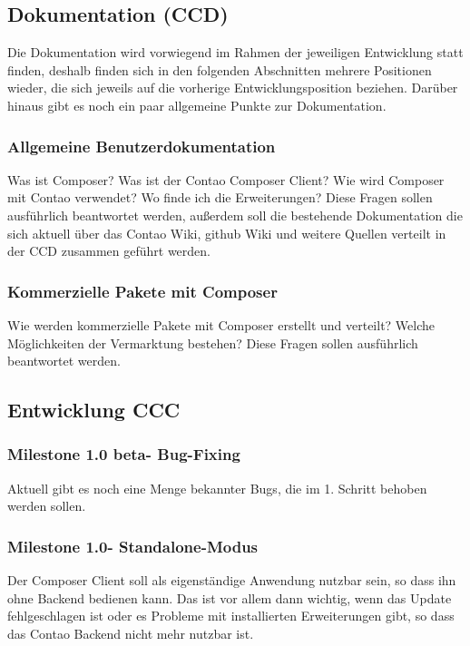 \documentclass[
paper=a4,
draft=false,%
fontsize=10pt%
]{scrartcl}
\begin{document}
\subsection{Dokumentation (CCD)}

Die Dokumentation wird vorwiegend im Rahmen der jeweiligen Entwicklung statt finden, deshalb finden sich in den folgenden Abschnitten mehrere Positionen  wieder, die sich jeweils auf die vorherige Entwicklungsposition beziehen. Darüber hinaus gibt es noch ein paar allgemeine Punkte zur Dokumentation.

\subsubsection{Allgemeine Benutzerdokumentation}

Was ist Composer? Was ist der Contao Composer Client? Wie wird Composer mit Contao verwendet? Wo finde ich die Erweiterungen?
Diese Fragen sollen ausführlich beantwortet werden, außerdem soll die bestehende Dokumentation die sich aktuell über das Contao Wiki, github Wiki und weitere Quellen verteilt in der CCD zusammen geführt werden.

\subsubsection{Kommerzielle Pakete mit Composer}

Wie werden kommerzielle Pakete mit Composer erstellt und verteilt? Welche Möglichkeiten der Vermarktung bestehen? Diese Fragen sollen ausführlich beantwortet werden.

\subsection{Entwicklung CCC}

\subsubsection[Milestone 1.0 beta - Bug-Fixing]{Milestone 1.0 beta\footnotemark - Bug-Fixing}
Aktuell gibt es noch eine Menge bekannter Bugs, die im 1. Schritt behoben werden sollen.

\subsubsection[Milestone 1.0 - Standalone-Modus]{Milestone 1.0\footnotemark - Standalone-Modus}
Der Composer Client soll als eigenständige Anwendung nutzbar sein, so dass ihn ohne Backend bedienen kann. Das ist vor allem dann wichtig, wenn das Update fehlgeschlagen ist oder es Probleme mit installierten Erweiterungen gibt, so dass das Contao Backend nicht mehr nutzbar ist.
\end{document}
